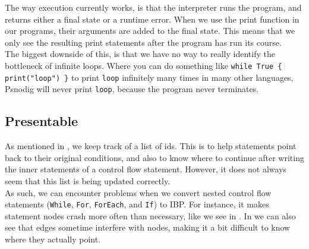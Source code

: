The way execution currently works, is that the interpreter runs the program, and returns either a final state or a runtime error. When we use the print function in our programs, their arguments are added to the final state. This means that we only see the resulting print statements after the program has run its course. \\

The biggest downside of this, is that we have no way to really identify the bottleneck of infinite loops. Where you can do something like \texttt{while True \{ print("loop") \}} to print \texttt{loop} infinitely many times in many other languages, Psnodig will never print \texttt{loop}, because the program never terminates.

\subsection{Presentable}

As mentioned in , we keep track of a list of ids. This is to help statements point back to their original conditions, and also to know where to continue after writing the inner statements of a control flow statement. However, it does not always seem that this list is being updated correctly. \\

As such, we can encounter problems when we convert nested control flow statements (\texttt{While}, \texttt{For}, \texttt{ForEach}, and \texttt{If}) to IBP. For instance, it makes statement nodes crash more often than necessary, like we see in . In  we can also see that edges sometime interfere with nodes, making it a bit difficult to know where they actually point. \\